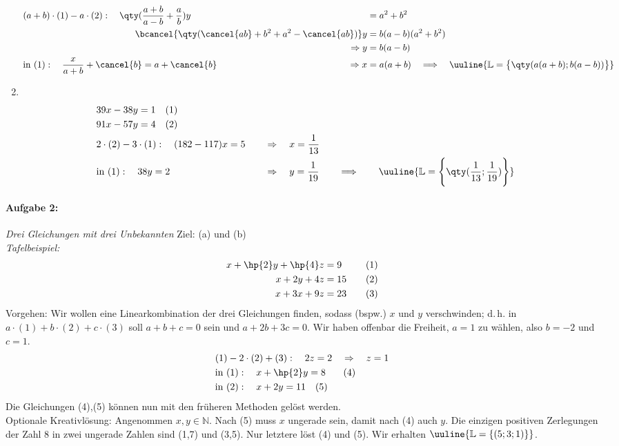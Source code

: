 \begin{enumerate}[label=(\alph*)]
\begin{alignat*}{3}
        &(a+b) \cdot (1) - a\cdot(2): \quad \qty(\frac{a+b}{a-b}+\frac{a}{b}) y &&= a^2 +b^2 \\
        && \hspace{-3.5cm}\bcancel{\qty(\cancel{ab}+b^2 + a^2 - \cancel{ab})}y &= b(a-b)(a^2 +b^2) \\
        && \hspace{-1cm}\Rightarrow y &= b(a-b) \\
        &\text{in }(1): \quad \frac{x}{a+b} +\cancel{b} = a+ \cancel{b} & \hspace{-1cm}\Rightarrow x &= a(a+b) \quad \Longrightarrow \quad \uuline{\mathbb{L} = \big\{\qty(a(a+b);b(a-b))\big\}}
    \end{alignat*}
    \item $~$\\[-1.45cm] 
    \begin{alignat*}{3}
        &39x-38y=1 \quad (1) \\
        &91x-57y=4 \quad (2) \\
        &2\cdot(2)-3\cdot(1): \quad (182-117)x = 5 \quad &&\Rightarrow \quad x = \frac{1}{13} \\
        &\text{in } (1): \quad 38y = 2 &&  \Rightarrow \quad y = \frac{1}{19} \qquad \Longrightarrow \qquad \uuline{\mathbb{L} = \Bigg\{\qty(\frac{1}{13};\frac{1}{19})\Bigg\}}
    \end{alignat*}
\end{enumerate}

\newpage
\paragraph{Aufgabe 2: } \emph{Drei Gleichungen mit drei Unbekannten} \hfill Ziel: (a) und (b)\\[0.2cm]
%
\emph{Tafelbeispiel: }
\begin{alignat*}{2}
    x+ \hp{2}y + \hp{4}z &= 9 &&\quad (1) \\
    x+2y+4z&=15 &&\quad (2) \\
    x+3x+9z&=23 &&\quad (3)
\end{alignat*}
Vorgehen: Wir wollen eine Linearkombination der drei Gleichungen finden, sodass (bspw.) $x$ und $y$ verschwinden; d.\,h. in $a\cdot(1)+b\cdot(2)+c\cdot(3)$ soll $a+b+c =0$ sein und $a+2b+3c=0$. Wir haben offenbar die Freiheit, $a=1$ zu wählen, also $b=-2$ und $c=1$.
\begin{align}
    &(1)-2\cdot(2)+(3): \quad 2z=2 \quad \Rightarrow \quad z=1 \\
    &\text{in }(1): \quad x+\hp{2}y = 8\;\;\; \quad(4)\\
    &\text{in }(2): \quad x+2y = 11 \quad (5)
\end{align}
Die Gleichungen (4),(5) können nun mit den früheren Methoden gelöst werden. \\
Optionale Kreativlösung: Angenommen $x,y \in \mathbb{N}$. Nach (5) muss $x$ ungerade sein, damit nach (4) auch $y$. Die einzigen positiven Zerlegungen der Zahl 8 in zwei ungerade Zahlen sind (1,7) und (3,5). Nur letztere löst (4) und (5). Wir erhalten $\uuline{\mathbb{L} = \{(5;3;1)\}}$.

